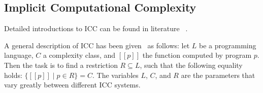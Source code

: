 \subsection{Implicit Computational Complexity}\label{subsec:icc}

Detailed introductions to ICC can be found in literature
~\cite{dallago2012,moyen2017,pechoux2020,dallago2022}.

A general description of ICC has been given~\cite{pechoux2020} as follows: let $L$ be a programming language, $C$ a complexity class, and $[\![ p ]\!]$ the function computed by program $p$.
Then the task is to find a restriction $R \subseteq L$, such that the following equality holds: $\{ [\![ p ]\!] \; \vert \; p \in R \} = C$.
The variables $L$, $C$, and $R$ are the parameters that vary greatly between different ICC systems.